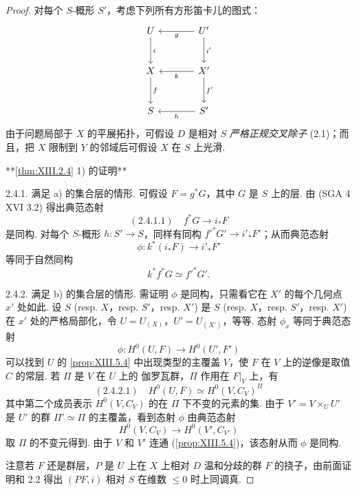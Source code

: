 \begin{proof}
对每个 $S$-概形 $S'$，考虑下列所有方形笛卡儿的图式：
\[
\begin{tikzcd}[row sep=large, column sep=large]
U \arrow[d,"{i}"] & U' \arrow[l,"g"] \arrow[d,"{i'}"] \\
X \arrow[d,"{f}"] & X' \arrow[l,"k"] \arrow[d,"{f'}"] \\
S & S' \arrow[l,"h"]
\end{tikzcd}
\]
由于问题局部于 $X$ 的平展拓扑，可假设 $D$ 是相对 $S$ \emph{严格正规交叉除子} (2.1)；而且，把 $X$ 限制到 $Y$ 的邻域后可假设 $X$ 在 $S$ 上光滑.

**\ref{thm:XIII.2.4} 1) 的证明**

2.4.1. 满足 a) 的集合层的情形. 可假设 $F = g^{*} G$，其中 $G$ 是 $S$ 上的层. 由 (SGA 4 XVI 3.2) 得出典范态射
\[
(2.4.1.1) \quad f^{*} G \longrightarrow i_* F
\]
是同构. 对每个 $S$-概形 $h \colon S' \to S$，同样有同构 $f'^{*} G' \to i'_* F'$；从而典范态射
\[
\phi \colon k^{*}(i_* F) \longrightarrow i'_* F'
\]
等同于自然同构
\[
k^{*} f^{*} G \simeq f'^{*} G'.
\]

2.4.2. 满足 b) 的集合层的情形. 需证明 $\phi$ 是同构，只需看它在 $X'$ 的每个几何点 $x'$ 处如此. 设 $S$ (resp. $X$，resp. $S'$，resp. $X'$) 是 $S$ (resp. $X$，resp. $S'$，resp. $X'$) 在 $x'$ 处的严格局部化，令 $U = U_{(X)}$，$U' = U_{(X')}$，等等. 态射 $\phi_x$ 等同于典范态射
\[
\phi \colon H^0(U, F) \longrightarrow H^0(U', F')
\]
可以找到 $U$ 的 \ref{prop:XIII.5.4} 中出现类型的主覆盖 $V$，使 $F$ 在 $V$ 上的逆像是取值 $C$ 的常层. 若 $\Pi$ 是 $V$ 在 $U$ 上的 伽罗瓦群，$\Pi$ 作用在 $F|_V$ 上，有
\[
(2.4.2.1) \quad H^0(U, F) \simeq H^0(V, C_V)^{\Pi}
\]
其中第二个成员表示 $H^0(V, C_V)$ 的在 $\Pi$ 下不变的元素的集. 由于 $V' = V \times_U U'$ 是 $U'$ 的群 $\Pi' \simeq \Pi$ 的主覆盖，看到态射 $\phi$ 由典范态射
\[
H^0(V, C_V) \longrightarrow H^0(V', C_{V'})
\]
取 $\Pi$ 的不变元得到. 由于 $V$ 和 $V'$ 连通 (\cref{prop:XIII.5.4})，该态射从而 $\phi$ 是同构.

注意若 $F$ 还是群层，$P$ 是 $U$ 上在 $X$ 上相对 $D$ 温和分歧的群 $F$ 的挠子，由前面证明和 2.2 得出 $(P F, i)$ 相对 $S$ 在维数 $\leqslant 0$ 时上同调真.


\end{proof}
